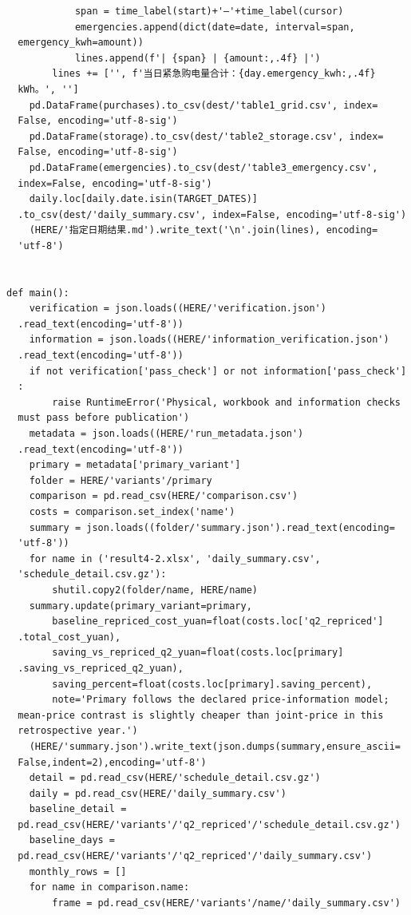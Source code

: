 \begin{verbatim}
            span = time_label(start)+'—'+time_label(cursor)
            emergencies.append(dict(date=date, interval=span,
  emergency_kwh=amount))
            lines.append(f'| {span} | {amount:,.4f} |')
        lines += ['', f'当日紧急购电量合计：{day.emergency_kwh:,.4f}
  kWh。', '']
    pd.DataFrame(purchases).to_csv(dest/'table1_grid.csv', index=
  False, encoding='utf-8-sig')
    pd.DataFrame(storage).to_csv(dest/'table2_storage.csv', index=
  False, encoding='utf-8-sig')
    pd.DataFrame(emergencies).to_csv(dest/'table3_emergency.csv',
  index=False, encoding='utf-8-sig')
    daily.loc[daily.date.isin(TARGET_DATES)]
  .to_csv(dest/'daily_summary.csv', index=False, encoding='utf-8-sig')
    (HERE/'指定日期结果.md').write_text('\n'.join(lines), encoding=
  'utf-8')


def main():
    verification = json.loads((HERE/'verification.json')
  .read_text(encoding='utf-8'))
    information = json.loads((HERE/'information_verification.json')
  .read_text(encoding='utf-8'))
    if not verification['pass_check'] or not information['pass_check']
  :
        raise RuntimeError('Physical, workbook and information checks
  must pass before publication')
    metadata = json.loads((HERE/'run_metadata.json')
  .read_text(encoding='utf-8'))
    primary = metadata['primary_variant']
    folder = HERE/'variants'/primary
    comparison = pd.read_csv(HERE/'comparison.csv')
    costs = comparison.set_index('name')
    summary = json.loads((folder/'summary.json').read_text(encoding=
  'utf-8'))
    for name in ('result4-2.xlsx', 'daily_summary.csv',
  'schedule_detail.csv.gz'):
        shutil.copy2(folder/name, HERE/name)
    summary.update(primary_variant=primary,
        baseline_repriced_cost_yuan=float(costs.loc['q2_repriced']
  .total_cost_yuan),
        saving_vs_repriced_q2_yuan=float(costs.loc[primary]
  .saving_vs_repriced_q2_yuan),
        saving_percent=float(costs.loc[primary].saving_percent),
        note='Primary follows the declared price-information model;
  mean-price contrast is slightly cheaper than joint-price in this
  retrospective year.')
    (HERE/'summary.json').write_text(json.dumps(summary,ensure_ascii=
  False,indent=2),encoding='utf-8')
    detail = pd.read_csv(HERE/'schedule_detail.csv.gz')
    daily = pd.read_csv(HERE/'daily_summary.csv')
    baseline_detail =
  pd.read_csv(HERE/'variants'/'q2_repriced'/'schedule_detail.csv.gz')
    baseline_days =
  pd.read_csv(HERE/'variants'/'q2_repriced'/'daily_summary.csv')
    monthly_rows = []
    for name in comparison.name:
        frame = pd.read_csv(HERE/'variants'/name/'daily_summary.csv')

\end{verbatim}
